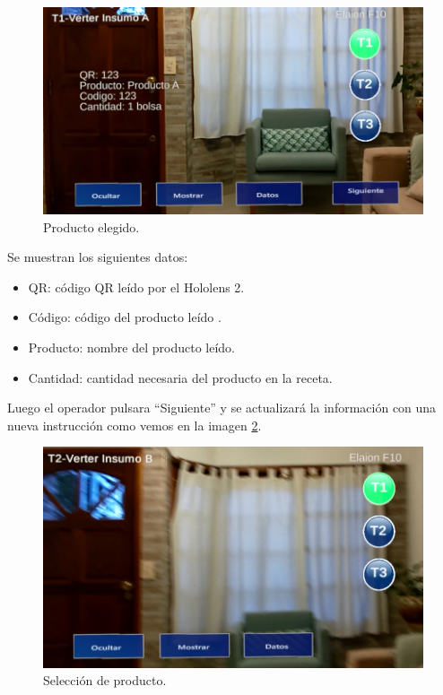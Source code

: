 \begin{figure}[htpb]
	\centering
	\includegraphics[scale=.5]{./Figures/i9.PNG}
	\caption{Producto elegido\protect\footnotemark.}
	\label{fig:i9}
\end{figure}

\vspace{60px}
Se muestran los siguientes datos:

\begin{itemize}
\item QR: código QR leído por el Hololens 2.
\item Código: código del producto leído .
\item Producto: nombre del producto leído. 
\item Cantidad: cantidad necesaria del producto en la receta.
\end{itemize}

Luego el operador pulsara ``Siguiente'' y se actualizará la información con una nueva instrucción como vemos en la imagen \ref{fig:i11}.

\begin{figure}[htpb]
	\centering
	\includegraphics[scale=.5]{./Figures/i11.PNG}
	\caption{Selección de producto\protect\footnotemark.}
	\label{fig:i11}
\end{figure}

